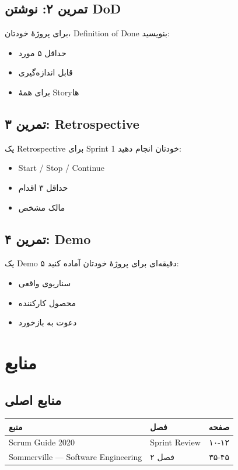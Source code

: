 \documentclass[12pt, a4paper]{article}
\begin{document}
\subsection{تمرین ۲: نوشتن DoD}
برای پروژهٔ خودتان، Definition of Done بنویسید:
\begin{itemize}
    \item حداقل ۵ مورد
    \item قابل اندازه‌گیری
    \item برای همهٔ Storyها
\end{itemize}

\subsection{تمرین ۳: Retrospective}
یک Retrospective برای Sprint 1 خودتان انجام دهید:
\begin{itemize}
    \item Start / Stop / Continue
    \item حداقل ۳ اقدام
    \item مالک مشخص
\end{itemize}

\subsection{تمرین ۴: Demo}
یک Demo ۵ دقیقه‌ای برای پروژهٔ خودتان آماده کنید:
\begin{itemize}
    \item سناریوی واقعی
    \item محصول کارکننده
    \item دعوت به بازخورد
\end{itemize}

\section{منابع}

\subsection{منابع اصلی}

\begin{center}
\begin{tabular}{|l|l|c|}
\hline
\textbf{منبع} & \textbf{فصل} & \textbf{صفحه} \\
\hline
Scrum Guide 2020 & Sprint Review & ۱۰-۱۲ \\
\hline
Sommerville — Software Engineering & فصل ۲ & ۳۵-۴۵ \\
\hline
\end{tabular}
\end{center}
\end{document}
